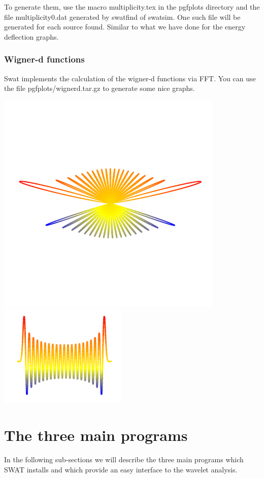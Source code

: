 \documentclass[12pt]{article}
\begin{document}
To generate them, use the macro {\color{brown}multiplicity.tex} in the pgfplots directory
and the file {\color{brown}multiplicity0.dat} generated by swatfind of swatsim.
One such file will be generated for each source found.
Similar to what we have done for the energy deflection graphs.


\subsubsection{Wigner-d functions}

Swat implements the calculation of the wigner-d functions via FFT.
You can use the file pgfplots/wignerd.tar.gz to generate some nice graphs.

\includegraphics[scale=1.0]{wignerpolar.pdf}
\includegraphics[scale=1.0]{wigner.pdf} 

\section{The three main programs}
In the following sub-sections we will describe the three main programs which 
SWAT installs and which provide an easy interface to the wavelet analysis.
\end{document}
